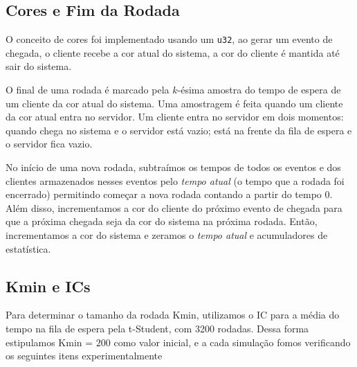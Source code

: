 \documentclass[a4paper]{article}
\newcommand{\inlcode}{\texttt}
\begin{document}
\subsection{Cores e Fim da Rodada}
O conceito de cores foi implementado usando um \inlcode{u32},
ao gerar um evento de chegada,
o cliente recebe a cor atual do sistema,
a cor do cliente é mantida até sair do sistema.

O final de uma rodada é marcado pela \(k\)-ésima
amostra do tempo de espera de
um cliente da cor atual do sistema.
Uma amostragem é feita quando um cliente da cor atual
entra no servidor.
Um cliente entra no servidor em dois momentos:
quando chega no sistema e o servidor está vazio;
está na frente da fila de espera e o servidor fica vazio.

No início de uma nova rodada,
subtraímos os tempos de todos os eventos e
dos clientes armazenados nesses eventos
pelo \emph{tempo atual} (o tempo que a rodada foi encerrado)
permitindo começar a nova rodada contando a partir do tempo \(0\).
Além disso, incrementamos a cor do cliente
do próximo evento de chegada
para que a próxima chegada seja da cor do sistema na próxima rodada.
Então, incrementamos a cor do sistema e
zeramos o \emph{tempo atual} e
acumuladores de estatística.

\subsection{Kmin e ICs}
Para determinar o tamanho da rodada Kmin, utilizamos o IC para a
média do tempo na fila de espera pela t-Student, com 3200 rodadas.
Dessa forma estipulamos Kmin = \(200\) como valor inicial, e a cada simulação
fomos verificando os seguintes itens experimentalmente
\end{document}
